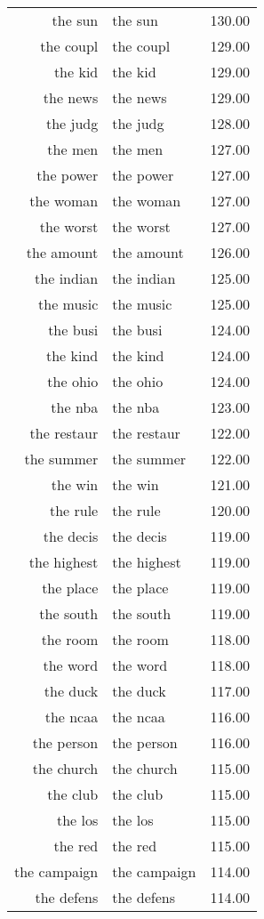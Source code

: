 \begin{table}[ht]
\begin{tabular}{rlr}
  the sun & the sun & 130.00 \\ 
  the coupl & the coupl & 129.00 \\ 
  the kid & the kid & 129.00 \\ 
  the news & the news & 129.00 \\ 
  the judg & the judg & 128.00 \\ 
  the men & the men & 127.00 \\ 
  the power & the power & 127.00 \\ 
  the woman & the woman & 127.00 \\ 
  the worst & the worst & 127.00 \\ 
  the amount & the amount & 126.00 \\ 
  the indian & the indian & 125.00 \\ 
  the music & the music & 125.00 \\ 
  the busi & the busi & 124.00 \\ 
  the kind & the kind & 124.00 \\ 
  the ohio & the ohio & 124.00 \\ 
  the nba & the nba & 123.00 \\ 
  the restaur & the restaur & 122.00 \\ 
  the summer & the summer & 122.00 \\ 
  the win & the win & 121.00 \\ 
  the rule & the rule & 120.00 \\ 
  the decis & the decis & 119.00 \\ 
  the highest & the highest & 119.00 \\ 
  the place & the place & 119.00 \\ 
  the south & the south & 119.00 \\ 
  the room & the room & 118.00 \\ 
  the word & the word & 118.00 \\ 
  the duck & the duck & 117.00 \\ 
  the ncaa & the ncaa & 116.00 \\ 
  the person & the person & 116.00 \\ 
  the church & the church & 115.00 \\ 
  the club & the club & 115.00 \\ 
  the los & the los & 115.00 \\ 
  the red & the red & 115.00 \\ 
  the campaign & the campaign & 114.00 \\ 
  the defens & the defens & 114.00 \\ 

\end{tabular}
\end{table}
